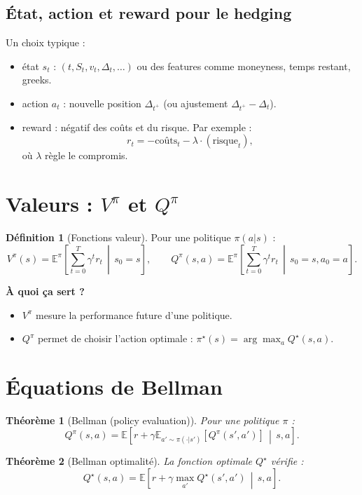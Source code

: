 \documentclass[11pt,a4paper]{report}
\newcommand{\E}{\mathbb{E}}
\newcommand{\1}{\mathbbm{1}}
\theoremstyle{definition}
\newtheorem{definition}{Définition}[chapter]
\theoremstyle{plain}
\newtheorem{theorem}{Théorème}[chapter]
\theoremstyle{remark}
\begin{document}
\subsection{État, action et reward pour le hedging}
Un choix typique :
\begin{itemize}
  \item état $s_t$ : $(t, S_t, v_t, \Delta_t,\ldots)$ ou des features comme moneyness, temps restant, greeks.
  \item action $a_t$ : nouvelle position $\Delta_{t^+}$ (ou ajustement $\Delta_{t^+}-\Delta_t$).
  \item reward : négatif des coûts et du risque.
  Par exemple :
  \[
  r_t = -\text{coûts}_t - \lambda \cdot (\text{risque}_t),
  \]
  où $\lambda$ règle le compromis.
\end{itemize}

\section{Valeurs : $V^\pi$ et $Q^\pi$}
\begin{definition}[Fonctions valeur]
Pour une politique $\pi(a|s)$ :
\[
V^\pi(s)=\E^\pi\left[\sum_{t=0}^{T} \gamma^t r_t \,\middle|\, s_0=s\right],
\qquad
Q^\pi(s,a)=\E^\pi\left[\sum_{t=0}^{T} \gamma^t r_t \,\middle|\, s_0=s, a_0=a\right].
\]
\end{definition}

\textbf{À quoi ça sert ?}
\begin{itemize}
  \item $V^\pi$ mesure la performance future d'une politique.
  \item $Q^\pi$ permet de choisir l'action optimale : $\pi^\star(s)=\arg\max_a Q^\star(s,a)$.
\end{itemize}

\section{Équations de Bellman}
\label{sec:bellman}

\begin{theorem}[Bellman (policy evaluation)]
Pour une politique $\pi$ :
\[
Q^\pi(s,a)=\E\left[r + \gamma \E_{a'\sim\pi(\cdot|s')}[Q^\pi(s',a')] \,\middle|\, s,a\right].
\]
\end{theorem}

\begin{theorem}[Bellman optimalité]
La fonction optimale $Q^\star$ vérifie :
\[
Q^\star(s,a)=\E\left[r + \gamma \max_{a'} Q^\star(s',a') \,\middle|\, s,a\right].
\]
\end{theorem}
\end{document}
